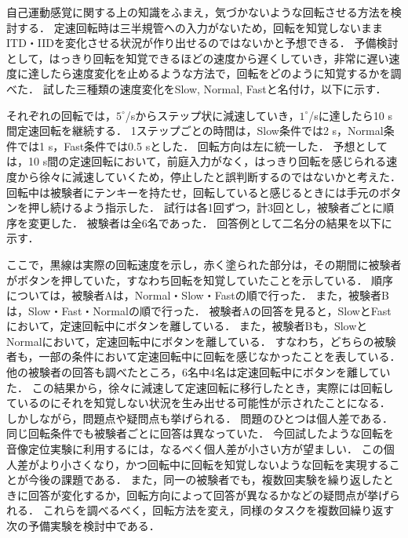 \documentclass[12pt,a4j]{jsarticle}
\renewcommand{\ }{\hspace{1zw}}
\begin{document}
\ 自己運動感覚に関する上の知識をふまえ，気づかないような回転させる方法を検討する．
定速回転時は三半規管への入力がないため，回転を知覚しないままITD・IIDを変化させる状況が作り出せるのではないかと予想できる．
予備検討として，はっきり回転を知覚できるほどの速度から遅くしていき，非常に遅い速度に達したら速度変化を止めるような方法で，回転をどのように知覚するかを調べた．
試した三種類の速度変化をSlow, Normal, Fastと名付け，以下に示す．

それぞれの回転では，$5^\circ$/sからステップ状に減速していき，$1^\circ$/sに達したら10 s間定速回転を継続する．
1ステップごとの時間は，Slow条件では2 s，Normal条件では1 s，Fast条件では0.5 sとした．
回転方向は左に統一した．
予想としては，10 s間の定速回転において，前庭入力がなく，はっきり回転を感じられる速度から徐々に減速していくため，停止したと誤判断するのではないかと考えた．
回転中は被験者にテンキーを持たせ，回転していると感じるときには手元のボタンを押し続けるよう指示した．
試行は各1回ずつ，計3回とし，被験者ごとに順序を変更した．
被験者は全6名であった．
回答例として二名分の結果を以下に示す．

ここで，黒線は実際の回転速度を示し，赤く塗られた部分は，その期間に被験者がボタンを押していた，すなわち回転を知覚していたことを示している．
順序については，被験者Aは，Normal・Slow・Fastの順で行った．
また，被験者Bは，Slow・Fast・Normalの順で行った．
被験者Aの回答を見ると，SlowとFastにおいて，定速回転中にボタンを離している．
また，被験者Bも，SlowとNormalにおいて，定速回転中にボタンを離している．
すなわち，どちらの被験者も，一部の条件において定速回転中に回転を感じなかったことを表している．
他の被験者の回答も調べたところ，6名中4名は定速回転中にボタンを離していた．
この結果から，徐々に減速して定速回転に移行したとき，実際には回転しているのにそれを知覚しない状況を生み出せる可能性が示されたことになる．
しかしながら，問題点や疑問点も挙げられる．
問題のひとつは個人差である．
同じ回転条件でも被験者ごとに回答は異なっていた．
今回試したような回転を音像定位実験に利用するには，なるべく個人差が小さい方が望ましい．
この個人差がより小さくなり，かつ回転中に回転を知覚しないような回転を実現することが今後の課題である．
また，同一の被験者でも，複数回実験を繰り返したときに回答が変化するか，回転方向によって回答が異なるかなどの疑問点が挙げられる．
これらを調べるべく，回転方法を変え，同様のタスクを複数回繰り返す次の予備実験を検討中である．
\end{document}

